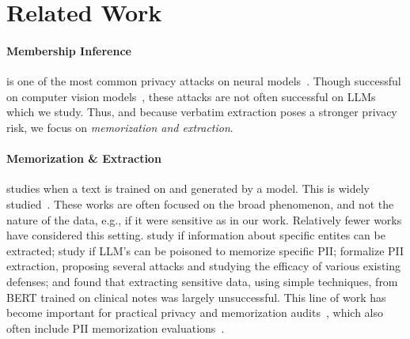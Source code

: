 \section{Related Work}


\paragraph{Membership Inference}
is one of the most common privacy attacks on neural models~\citep{shokri2017membership}. Though successful on computer vision models~\citep{yeom2018privacy,salem2018ml,sablayrolles2019white,choquette2021label,carlini2022membership,jagielski2024students}, these attacks are not often successful on LLMs~\citep{duan2024membership} which we study. Thus, and because verbatim extraction poses a stronger privacy risk, we focus on \emph{memorization and extraction}. 


\paragraph{Memorization \& Extraction}
studies when a text is trained on and generated by a model. This is widely studied~\citep{secretsharer,carlini-extraction, quantifying, lee-etal-2022-deduplicating, counterfactual, ippolito-etal-2023-preventing,biderman2023emergent, pythia, kudugunta2024madlad,nasr2023scalable, chang-etal-2023-speak, ozdayi-etal-2023-controlling, compression, decop, wang-etal-2024-unlocking}. These works are often focused on the broad phenomenon, and not the nature of the data, e.g., if it were sensitive as in our work. Relatively fewer works have considered this setting. \citet{huang-etal-2022-large} study if information about specific entites can be extracted; \citet{panda2024teach} study if LLM's can be poisoned to memorize specific PII; \citet{PII-leakage} formalize PII extraction, proposing several attacks and studying the efficacy of various existing defenses; and \citet{lehman-etal-2021-bert} found that extracting sensitive data, using simple techniques, from BERT trained on clinical notes was largely unsuccessful. This line of work has become important for practical privacy and memorization audits~\citep{anil2023palm,team2023gemini,dubey-2024-evaluating}, which also often include PII memorization evaluations~\citep{team2023gemini,team2024gemini,team2024gemma,team2024gemma2,team2024codegemma}. 
\vspace{-1em}

